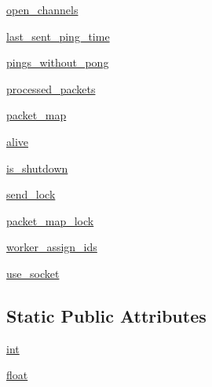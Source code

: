 \begin{DoxyCompactItemize}
\item 
\hyperlink{classparlai_1_1mturk_1_1core_1_1dev_1_1socket__manager_1_1SocketManager_a2f80642e3ea590f4f9428fc2b29d6795}{open\+\_\+channels}
\item 
\hyperlink{classparlai_1_1mturk_1_1core_1_1dev_1_1socket__manager_1_1SocketManager_ac5196ddaac240e82a7b4bdba7afdf59b}{last\+\_\+sent\+\_\+ping\+\_\+time}
\item 
\hyperlink{classparlai_1_1mturk_1_1core_1_1dev_1_1socket__manager_1_1SocketManager_acc4733807d5b940c2938e5088eb452e5}{pings\+\_\+without\+\_\+pong}
\item 
\hyperlink{classparlai_1_1mturk_1_1core_1_1dev_1_1socket__manager_1_1SocketManager_a2733b963a320d8925277bd8078308d9a}{processed\+\_\+packets}
\item 
\hyperlink{classparlai_1_1mturk_1_1core_1_1dev_1_1socket__manager_1_1SocketManager_ade1c4af9d5ec8dc60997553db37b236c}{packet\+\_\+map}
\item 
\hyperlink{classparlai_1_1mturk_1_1core_1_1dev_1_1socket__manager_1_1SocketManager_a853eb0d94f86024bb140644e0a003946}{alive}
\item 
\hyperlink{classparlai_1_1mturk_1_1core_1_1dev_1_1socket__manager_1_1SocketManager_af6ccd7262adc876b6e752257a7feeb31}{is\+\_\+shutdown}
\item 
\hyperlink{classparlai_1_1mturk_1_1core_1_1dev_1_1socket__manager_1_1SocketManager_acc0a0907e66f6bf9b510b493399aaf45}{send\+\_\+lock}
\item 
\hyperlink{classparlai_1_1mturk_1_1core_1_1dev_1_1socket__manager_1_1SocketManager_a2ac5139867a0a05050ff3b388cc0e8fa}{packet\+\_\+map\+\_\+lock}
\item 
\hyperlink{classparlai_1_1mturk_1_1core_1_1dev_1_1socket__manager_1_1SocketManager_ab385890b2361f4eacf67d60584ce99fa}{worker\+\_\+assign\+\_\+ids}
\item 
\hyperlink{classparlai_1_1mturk_1_1core_1_1dev_1_1socket__manager_1_1SocketManager_a8be72239621a74314dad4e859291ae89}{use\+\_\+socket}
\end{DoxyCompactItemize}
\subsection*{Static Public Attributes}
\begin{DoxyCompactItemize}
\item 
\hyperlink{classparlai_1_1mturk_1_1core_1_1dev_1_1socket__manager_1_1SocketManager_ab8eb36976c00298c970ef2e4dffdce3a}{int}
\item 
\hyperlink{classparlai_1_1mturk_1_1core_1_1dev_1_1socket__manager_1_1SocketManager_a6477343b84bde20f7d3fb3902508ef99}{float}
\end{DoxyCompactItemize}


